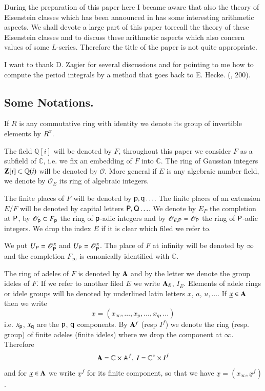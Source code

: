 During the preparation of this paper here I became aware that also the theory of Eisenstein classes which has been announced in \cite{art2-key7} has some interesting arithmetic aspects. We shall devote a large part of this paper to\pageoriginale recall the theory of these Eisenstein classes and to discuss these arithmetic aspects which also concern values of some $L$-series. Therefore the title of the paper is not quite appropriate.

I want to thank D. Zagier for several discussions and for pointing to me how to compute the period integrals by a method that goes back to E. Hecke. (\cite{art2-key10}, 200).



\setcounter{section}{1}
\setcounter{subsection}{-1}
\subsection{Some Notations.}\label{art2-sec1.0}
If $R$ is any commutative ring with identity we denote its group of invertible elements by $R^{x}$.

The field $\mathbb{Q}[i]$ will be denoted by $F$, throughout this paper we consider $F$ as a subfield of $\mathbb{C}$, i.e. we fix an embedding of $F$ into $\mathbb{C}$. The ring of Gaussian integers $\mathbf{Z}[i]\subset \mathbb{Q}(i)$ will be denoted by $\mathscr{O}$. More general if $E$ is any algebraic number field, we denote by $\mathscr{O}_{E}$ its ring of algebraic integers.

The finite places of $F$ will be denoted by $\mathsf{p},\mathsf{q}\ldots$. The finite places of an extension $E/F$ will be denoted by capital letters $\mathsf{P},\mathsf{Q}\ldots$. We denote by $E_{P}$ the completion at $\mathsf{P}$, by $\mathscr{O}_{\mathsf{p}}\subset F_{\mathsf{p}}$ the ring of $\mathsf{p}$-adic integers and by $\mathscr{O}_{E,\mathsf{P}}=\mathscr{O}_{\mathsf{P}}$ the ring of $\mathsf{P}$-adic integers. We drop the index $E$ if it is clear which filed we refer to.

We put $U_{P}=\mathscr{O}^{x}_{\mathsf{P}}$ and $U_{\mathsf{P}}=\mathscr{O}^{x}_{\mathsf{P}}$. The place of $F$ at infinity will be denoted by $\infty$ and the completion $F_{\infty}$ is canonically identified with $\mathbb{C}$.

\newpage

The ring of adeles of $F$ is denoted by $\mathbf{A}$ and by the letter we denote the group ideles of $F$. If we refer to another filed $E$ we write $\mathbf{A}_{E}$, $I_{E}$. Elements of adele rings or idele groups will be denoted by underlined latin letters $\underline{x}$, $\underline{a}$, $\underline{u},\ldots$. If $\underline{x}\in \mathbf{A}$ then we write
$$
\underline{x}=(x_{\infty},\ldots,x_{p},\ldots,x_{q},\ldots)
$$
i.e. $x_{\mathsf{p}}$, $x_{\mathsf{q}}$ are the $\mathsf{p}$, $\mathsf{q}$ components. By $\mathbf{A}^{f}$ (resp $I^{f}$) we denote the ring (resp. group) of finite adeles (finite ideles) where we drop the component at $\infty$. Therefore
$$
\mathbf{A}=\mathbb{C}\times \mathbb{A}^{f}, \ I=\mathbb{C}^{x}\times I^{f}
$$
and for $\underline{x}\in \mathbf{A}$ we write $\underline{x}^{f}$ for its finite component, so that we have $\underline{x}=(x_{\infty},\underline{x}^{f})$.


